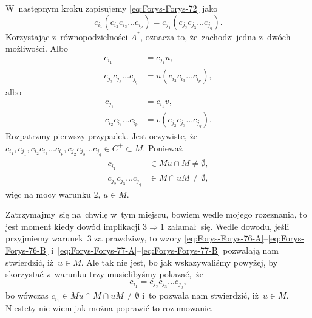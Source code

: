 \documentclass[a4paper,11pt]{article}
\begin{document}
W~następnym kroku zapisujemy \eqref{eq:Forys-Forys-72} jako
\begin{equation}
  \label{eq:Forys-Forys-74}
  c_{ i_{ 1 } } ( c_{ i_{ 2 } } c_{ i_{ 3 } } \ldots c_{ i_{ p } } ) =
  c_{ j_{ 1 } } ( c_{ j_{ 2 } } c_{ j_{ 3 } } \ldots c_{ j_{ q } }).
\end{equation}
Korzystając z~równopodzielności $A^{ * }$, oznacza to, że~zachodzi jedna
z~dwóch możliwości. Albo
\begin{subequations}
  \begin{align}
    \label{eq:Forys-Forys-75-A}
    c_{ i_{ 1 } } &= c_{ j_{ 1 } } u, \\
    \label{eq:Forys-Forys-75-B}
    c_{ j_{ 2 } } c_{ j_{ 3 } } \ldots c_{ j_{ q } }
                  &= u ( c_{ i_{ 2 } } c_{ i_{ 3 } } \ldots c_{ i_{ p } } ),
  \end{align}
\end{subequations}
albo
\begin{subequations}
  \begin{align}
    \label{eq:Forys-Forys-76-A}
    c_{ j_{ 1 } } &= c_{ i_{ 1 } } v, \\
    \label{eq:Forys-Forys-76-B}
    c_{ i_{ 2 } } c_{ i_{ 3 } } \ldots c_{ i_{ p } }
                  &= v ( c_{ j_{ 2 } } c_{ j_{ 3 } } \ldots c_{ j_{ q } } ).
  \end{align}
\end{subequations}
Rozpatrzmy pierwszy przypadek. Jest oczywiste,
że~$c_{ i_{ 1 } }, c_{ j_{ 1 } }, c_{ i_{ 2 } } c_{ i_{ 3 } } \ldots c_{ i_{ p } },
c_{ j_{ 2 } } c_{ j_{ 3 } } \ldots c_{ j_{ q } } \in C^{ + } \subset M$. Ponieważ
\begin{subequations}
  \begin{align}
    \label{eq:Forys-Forys-77-A}
    c_{ i_{ 1 } } &\in M u \cap M \neq \emptyset, \\
    \label{eq:Forys-Forys-77-B}
    c_{ j_{ 2 } } c_{ j_{ 3 } } \ldots c_{ j_{ q } } &\in M \cap u M \neq \emptyset,
  \end{align}
\end{subequations}
więc na mocy warunku 2, $u \in M$.

Zatrzymajmy~się na~chwilę w~tym miejscu, bowiem wedle mojego rozeznania,
to jest moment kiedy dowód implikacji $3 \Rightarrow 1$ załamał~się. Wedle dowodu,
jeśli przyjmiemy warunek~3 za prawdziwy, to wzory
\eqref{eq:Forys-Forys-76-A}--\eqref{eq:Forys-Forys-76-B}
i~\eqref{eq:Forys-Forys-77-A}--\eqref{eq:Forys-Forys-77-B} pozwalają nam
stwierdzić, iż~$u \in M$. Ale tak nie jest, bo jak wskazywaliśmy powyżej, by
skorzystać z~warunku trzy musielibyśmy pokazać,~że
\begin{equation}
  \label{eq:Forys-Forys-78}
  c_{ i_{ 1 } } = c_{ j_{ 2 } } c_{ j_{ 3 } } \ldots c_{ j_{ q } },
\end{equation}
bo wówczas $c_{ i_{ 1 } } \in M u \cap M \cap u M \neq \emptyset$ i~to pozwala nam stwierdzić,
iż~$u \in M$. Niestety nie wiem jak można poprawić to rozumowanie.
\end{document}
